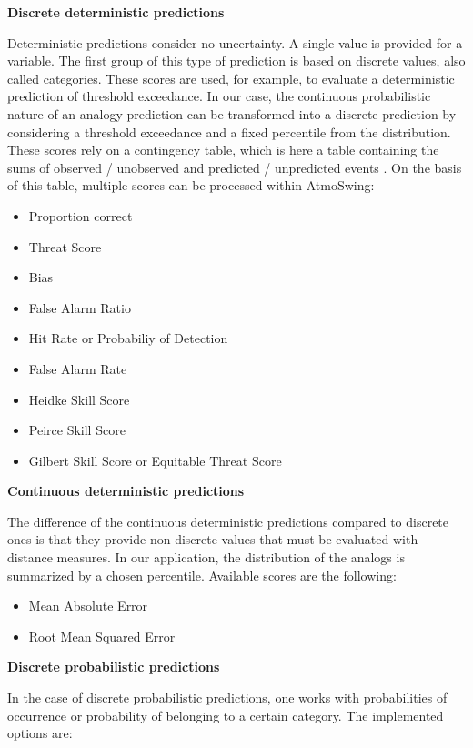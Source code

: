 \documentclass[review]{elsarticle}
\begin{document}
\textbf{Discrete deterministic predictions}

Deterministic predictions consider no uncertainty. A single value is provided for a variable. The first group of this type of prediction is based on discrete values, also called categories. These scores are used, for example, to evaluate a deterministic prediction of threshold exceedance. In our case, the continuous probabilistic nature of an analogy prediction can be transformed into a discrete prediction by considering a threshold exceedance and a fixed percentile from the distribution. These scores rely on a contingency table, which is here a table containing the sums of observed / unobserved and predicted / unpredicted events \citep{Wilks2006}. On the basis of this table, multiple scores can be processed within AtmoSwing:

\begin{itemize}
	\setlength\itemsep{-1mm}
	\item Proportion correct \citep{Finley1884}
	\item Threat Score \citep{Gilbert1884}
	\item Bias
	\item False Alarm Ratio
	\item Hit Rate or Probabiliy of Detection
	\item False Alarm Rate
	\item Heidke Skill Score \citep{Heidke1926}
	\item Peirce Skill Score \citep{Peirce1884}
	\item Gilbert Skill Score or Equitable Threat Score \citep{Gilbert1884}
\end{itemize}


\textbf{Continuous deterministic predictions}

The difference of the continuous deterministic predictions compared to discrete ones is that they provide non-discrete values that must be evaluated with distance measures. In our application, the distribution of the analogs is summarized by a chosen percentile. Available scores are the following:

\begin{itemize}
	\setlength\itemsep{-1mm}
	\item Mean Absolute Error
	\item Root Mean Squared Error
\end{itemize}


\textbf{Discrete probabilistic predictions}

In the case of discrete probabilistic predictions, one works with probabilities of occurrence or probability of belonging to a certain category. The implemented options are:
\end{document}
